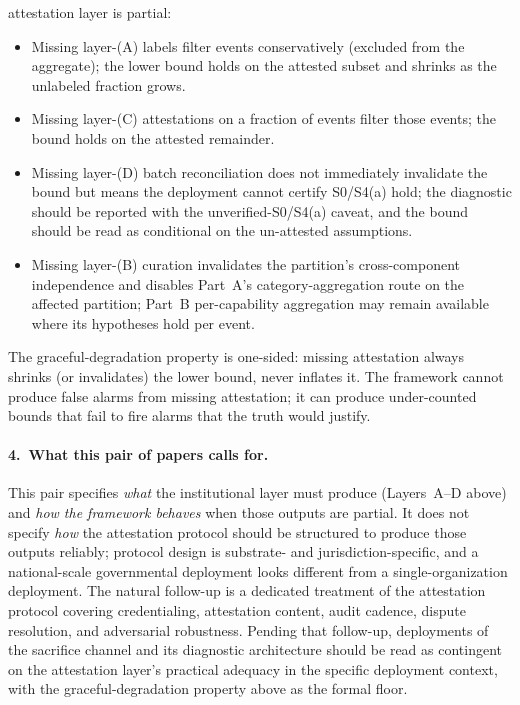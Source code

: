 \begin{remark}
attestation layer is partial:
\begin{itemize}
\item Missing layer-(A) labels filter events conservatively
  (excluded from the aggregate); the lower bound holds on the
  attested subset and shrinks as the unlabeled fraction grows.
\item Missing layer-(C) attestations on a fraction of events
  filter those events; the bound holds on the attested
  remainder.
\item Missing layer-(D) batch reconciliation does not
  immediately invalidate the bound but means the deployment
  cannot certify S0/S4(a) hold; the diagnostic should be
  reported with the unverified-S0/S4(a) caveat, and the bound
  should be read as conditional on the un-attested
  assumptions.
\item Missing layer-(B) curation invalidates the partition's
  cross-component independence and disables Part~A's
  category-aggregation route on the affected partition; Part~B
  per-capability aggregation may remain available where its
  hypotheses hold per event.
\end{itemize}
The graceful-degradation property is one-sided: missing
attestation always shrinks (or invalidates) the lower bound,
never inflates it.  The framework cannot produce false alarms
from missing attestation; it can produce under-counted bounds
that fail to fire alarms that the truth would justify.

\paragraph{4.~What this pair of papers calls for.}
This pair specifies \emph{what} the institutional layer must
produce (Layers~A--D above) and \emph{how the framework
behaves} when those outputs are partial.  It does not specify
\emph{how} the attestation protocol should be structured to
produce those outputs reliably; protocol design is
substrate- and jurisdiction-specific, and a national-scale
governmental deployment looks different from a
single-organization deployment.  The natural follow-up is a
dedicated treatment of the attestation protocol covering
credentialing, attestation content, audit cadence, dispute
resolution, and adversarial robustness.  Pending that
follow-up, deployments of the sacrifice channel and its
diagnostic architecture should be read as contingent on the
attestation layer's practical adequacy in the specific
deployment context, with the graceful-degradation property
above as the formal floor.
\end{remark}

